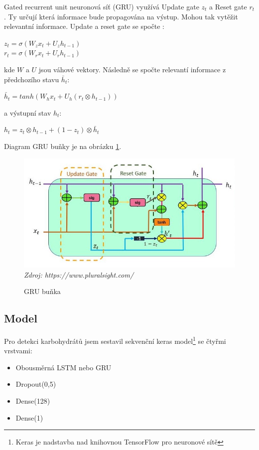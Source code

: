 Gated recurrent unit neuronová síť (GRU) využívá Update gate $z_{t}$ a Reset gate $r_{t}$. Ty určují která informace bude propagována na výstup. Mohou tak vytěžit relevantní informace. Update a reset gate se spočte \citep{cho.gru}:

$z_{t}=\sigma(W_{z}x_{t} + U_{z}h_{t-1})$\\\indent
$r_{t}=\sigma(W_{r}x_{t} + U_{r}h_{t-1})$

\noindent kde $W$ a $U$ jsou váhové vektory. Následně se spočte relevantí informace z předchozího stavu $\bar{h}_{t}$:

$\bar{h}_{t}=tanh(W_{h}x_{t} + U_{h}(r_{t} \otimes h_{t-1}))$

\noindent a výstupní stav $h_{t}$:

$h_{t}=z_{t} \otimes h_{t-1} + (1-z_{t}) \otimes \bar{h}_{t}$

Diagram GRU buňky je na obrázku \ref{fig:gru_cell}.

\begin{figure}[H]
\caption{GRU buňka}
\label{fig:gru_cell}
\centering
\includegraphics[width=1\textwidth]{img/cho/gru_cell.jpg}
\textit{Zdroj: https://www.pluralsight.com/}
\end{figure}

\subsection{Model}

Pro detekci karbohydrátů jsem sestavil sekvenční keras model\footnote{Keras je nadstavba nad knihovnou TensorFlow pro neuronové sítě} se čtyřmi vrstvami:
\begin{itemize}
\setlength\itemsep{0em}
\item Obousměrná LSTM nebo GRU
\item Dropout(0,5)
\item Dense(128)
\item Dense(1)
\end{itemize}

